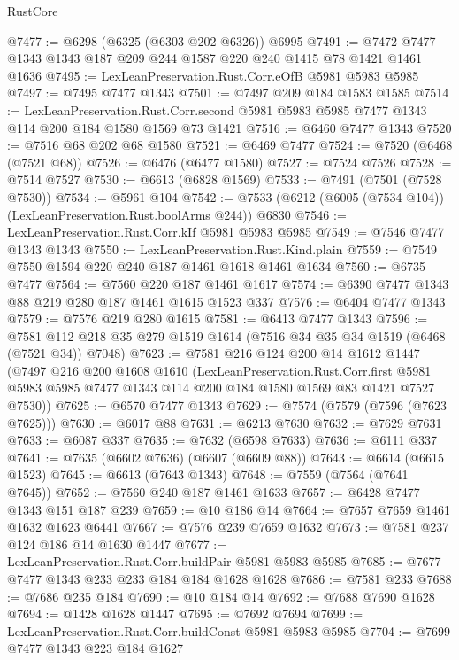 \begin{lexlean}{RustCore}
\begin{coremodule}
{\begin{coremodule}
{{{{{{{{{{{{{{{{{{{{{{{{{{{{{{{{{{{{{{{{{{{{{{{@7477 := @6298 (@6325 (@6303 @202 @6326)) @6995
@7491 := @7472 @7477 @1343 @1343 @187 @209 @244 @1587 @220 @240 @1415 @78 @1421 @1461 @1636
@7495 := LexLeanPreservation.Rust.Corr.eOfB @5981 @5983 @5985
@7497 := @7495 @7477 @1343
@7501 := @7497 @209 @184 @1583 @1585
@7514 := LexLeanPreservation.Rust.Corr.second
    @5981
    @5983
    @5985
    @7477
    @1343
    @114
    @200
    @184
    @1580
    @1569
    @73
    @1421
@7516 := @6460 @7477 @1343
@7520 := @7516 @68 @202 @68 @1580
@7521 := @6469 @7477
@7524 := @7520 (@6468 (@7521 @68))
@7526 := @6476 (@6477 @1580)
@7527 := @7524 @7526
@7528 := @7514 @7527
@7530 := @6613 (@6828 @1569)
@7533 := @7491 (@7501 (@7528 @7530))
@7534 := @5961 @104
@7542 := @7533 (@6212 (@6005 (@7534 @104)) (LexLeanPreservation.Rust.boolArms @244)) @6830
@7546 := LexLeanPreservation.Rust.Corr.kIf @5981 @5983 @5985
@7549 := @7546 @7477 @1343 @1343
@7550 := LexLeanPreservation.Rust.Kind.plain
@7559 := @7549 @7550 @1594 @220 @240 @187 @1461 @1618 @1461 @1634
@7560 := @6735 @7477
@7564 := @7560 @220 @187 @1461 @1617
@7574 := @6390 @7477 @1343 @88 @219 @280 @187 @1461 @1615 @1523 @337
@7576 := @6404 @7477 @1343
@7579 := @7576 @219 @280 @1615
@7581 := @6413 @7477 @1343
@7596 := @7581 @112 @218 @35 @279 @1519 @1614 (@7516 @34 @35 @34 @1519 (@6468 (@7521 @34)) @7048)
@7623 := @7581
    @216
    @124
    @200
    @14
    @1612
    @1447
    (@7497
      @216
      @200
      @1608
      @1610
      (LexLeanPreservation.Rust.Corr.first
        @5981
        @5983
        @5985
        @7477
        @1343
        @114
        @200
        @184
        @1580
        @1569
        @83
        @1421
        @7527
        @7530))
@7625 := @6570 @7477 @1343
@7629 := @7574 (@7579 (@7596 (@7623 @7625)))
@7630 := @6017 @88
@7631 := @6213 @7630
@7632 := @7629 @7631
@7633 := @6087 @337
@7635 := @7632 (@6598 @7633)
@7636 := @6111 @337
@7641 := @7635 (@6602 @7636) (@6607 (@6609 @88))
@7643 := @6614 (@6615 @1523)
@7645 := @6613 (@7643 @1343)
@7648 := @7559 (@7564 (@7641 @7645))
@7652 := @7560 @240 @187 @1461 @1633
@7657 := @6428 @7477 @1343 @151 @187 @239
@7659 := @10 @186 @14
@7664 := @7657 @7659 @1461 @1632 @1623 @6441
@7667 := @7576 @239 @7659 @1632
@7673 := @7581 @237 @124 @186 @14 @1630 @1447
@7677 := LexLeanPreservation.Rust.Corr.buildPair @5981 @5983 @5985
@7685 := @7677 @7477 @1343 @233 @233 @184 @184 @1628 @1628
@7686 := @7581 @233
@7688 := @7686 @235 @184
@7690 := @10 @184 @14
@7692 := @7688 @7690 @1628
@7694 := @1428 @1628 @1447
@7695 := @7692 @7694
@7699 := LexLeanPreservation.Rust.Corr.buildConst @5981 @5983 @5985
@7704 := @7699 @7477 @1343 @223 @184 @1627
}}}}}}}}}}}}}}}}}}}}}}}}}}}}}}}}}}}}}}}}}}}}}}}
\end{coremodule}}
\end{coremodule}
\end{lexlean}
